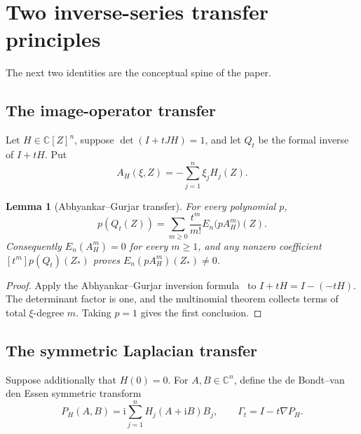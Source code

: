 \documentclass[11pt]{article}
\newtheorem{lemma}[theorem]{Lemma}
\newcommand{\C}{\mathbb C}
\newcommand{\ii}{\mathrm i}
\begin{document}
\section{Two inverse-series transfer principles}

The next two identities are the conceptual spine of the paper.

\subsection{The image-operator transfer}

Let $H\in\C[Z]^n$, suppose $\det(I+tJH)=1$, and let $Q_t$ be the formal
inverse of $I+tH$.  Put
\begin{equation}
 A_H(\xi,Z)=-\sum_{j=1}^n\xi_jH_j(Z).
\end{equation}

\begin{lemma}[Abhyankar--Gurjar transfer]\label{lem:image-transfer}
For every polynomial $p$,
\begin{equation}
 p(Q_t(Z))=
 \sum_{m\ge0}\frac{t^m}{m!}E_n\bigl(pA_H^m\bigr)(Z).
 \label{eq:image-transfer}
\end{equation}
Consequently $E_n(A_H^m)=0$ for every $m\ge1$, and any nonzero coefficient
$[t^m]p(Q_t)(Z_*)$ proves $E_n(pA_H^m)(Z_*)\ne0$.
\end{lemma}

\begin{proof}
Apply the Abhyankar--Gurjar inversion formula~\cite{bcw,zhao-ag} to
$I+tH=I-(-tH)$.
The determinant factor is one, and the multinomial theorem collects terms of
total $\xi$-degree $m$.  Taking $p=1$ gives the first conclusion.
\end{proof}

\subsection{The symmetric Laplacian transfer}

Suppose additionally that $H(0)=0$.  For $A,B\in\C^n$, define the
de Bondt--van den Essen symmetric transform~\cite{debondt}
\begin{equation}
 P_H(A,B)=\ii\sum_{j=1}^n H_j(A+\ii B)B_j,
 \qquad \Gamma_t=I-t\nabla P_H.
 \label{eq:symmetrization}
\end{equation}
\end{document}
